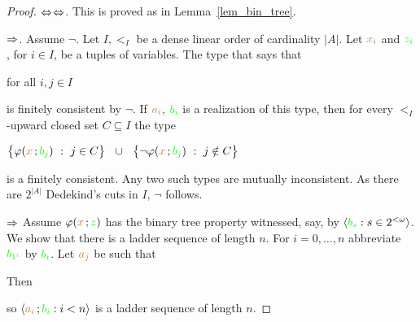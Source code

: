 \documentclass[creche.tex]{subfiles}
\begin{document}
\begin{proof}$\Leftrightarrow$$\Leftrightarrow$. This is proved as in Lemma~\ref{lem_bin_tree}.

$\Rightarrow$.
Assume $\neg$. Let $I,<_I$ be a dense linear order of cardinality $|A|$. Let ${\color{brown} x_i}$ and ${\color{green} z_i}$, for $i\in I$, be a tuples of variables. The type that says that

\hfill for all $i,j\in I$

is finitely consistent by $\neg$. If ${\color{brown} a_i}$, ${\color{green} b_i}$ is a realization of this type, then for every $<_I$-upward closed set $C\subseteq I$ the type

\hfil $\big\{\varphi({\color{brown} x}\,;{\color{green} b_j})\ :\ j\in C\big\}\ \ \cup\ \ \big\{\neg\varphi({\color{brown} x}\,;{\color{green} b_j})\ :\ j\notin C\big\}$

is a finitely consistent. Any two such types are mutually inconsistent. As there are $2^{|A|}$ Dedekind's cuts in $I$, $\neg$ follows.

$\Rightarrow$ Assume $\varphi({\color{brown} x}\,;{\color{green} z})$ has the binary tree property witnessed, say, by  $\langle{\color{green}b_s}:s\in 2^{<\omega}\rangle$. We show that there is a ladder sequence of length $n$. For $i=0,\dots, n$ abbreviate ${\color{green} b_{1^i}}$ by ${\color{green} b_i}$. Let ${\color{brown} a_j}$ be such that


Then


so $\langle{\color{brown}a_i}\,;{\color{green} b_i} : i<n\rangle$ is a ladder sequence of length $n$.
\end{proof}
\end{document}
